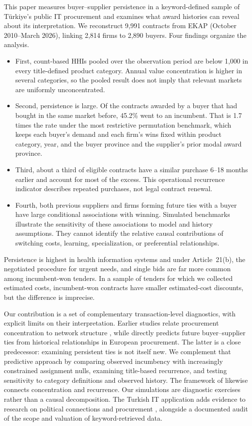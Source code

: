 \documentclass[pdflatex,sn-apa]{sn-jnl}
\begin{document}
This paper measures buyer--supplier persistence in a keyword-defined sample of Türkiye's public IT procurement and examines what award histories can reveal about its interpretation. We reconstruct 9,991 contracts from EKAP (October 2010--March 2026), linking 2,814 firms to 2,890 buyers. Four findings organize the analysis.
\begin{itemize}
\item First, count-based HHIs pooled over the observation period are below 1,000 in every title-defined product category. Annual value concentration is higher in several categories, so the pooled result does not imply that relevant markets are uniformly unconcentrated.
\item Second, persistence is large. Of the contracts awarded by a buyer that had bought in the same market before, 45.2\% went to an incumbent. That is 1.7 times the rate under the most restrictive permutation benchmark, which keeps each buyer's demand and each firm's wins fixed within product category, year, and the buyer province and the supplier's prior modal award province.
\item Third, about a third of eligible contracts have a similar purchase 6--18 months earlier and account for most of the excess. This operational recurrence indicator describes repeated purchases, not legal contract renewal.
\item Fourth, both previous suppliers and firms forming future ties with a buyer have large conditional associations with winning. Simulated benchmarks illustrate the sensitivity of these associations to model and history assumptions. They cannot identify the relative causal contributions of switching costs, learning, specialization, or preferential relationships.
\end{itemize}
Persistence is highest in health information systems and under Article~21(b), the negotiated procedure for urgent needs, and single bids are far more common among incumbent-won tenders. In a sample of tenders for which we collected estimated costs, incumbent-won contracts have smaller estimated-cost discounts, but the difference is imprecise.

Our contribution is a set of complementary transaction-level diagnostics, with explicit limits on their interpretation. Earlier studies relate procurement concentration to network structure \citep{Fountoukidis2023,Pliatsidis2024}, while \citet{FountoukidisPredictability2026} directly predicts future buyer--supplier ties from historical relationships in European procurement. The latter is a close predecessor: examining persistent ties is not itself new. We complement that predictive approach by comparing observed incumbency with increasingly constrained assignment nulls, examining title-based recurrence, and testing sensitivity to category definitions and observed history. The framework of \citet{Fountoukidis2026} likewise connects concentration and recurrence. Our simulations are diagnostic exercises rather than a causal decomposition. The Turkish IT application adds evidence to research on political connections and procurement \citep{Gurakar2016,GurakarBircan2019,KutlayYildirim2024}, alongside a documented audit of the scope and valuation of keyword-retrieved data.
\end{document}
